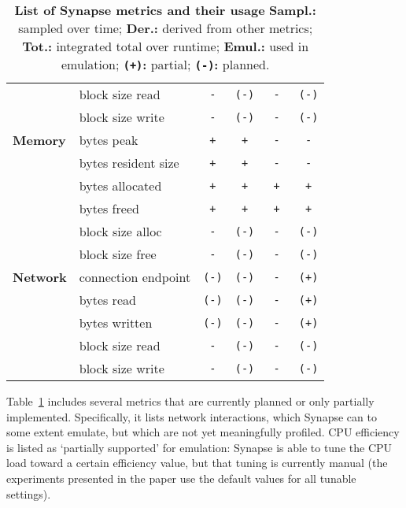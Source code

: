 \documentclass[10pt, conference, compsocconf]{IEEEtran}
\newcommand{\B}[1]{\textbf{#1}\xspace}
\newcommand{\T}[1]{\texttt{#1}\xspace}
\newcommand{\synapse}{Synapse\xspace}
\begin{document}
\begin{table}[t]
\begin{center}
\begin{tabular}{llcccc}
                 & block size read         &  \T{ - } &   \T{(-)} &  \T{ - } &  \T{(-)} \\
                 & block size write        &  \T{ - } &   \T{(-)} &  \T{ - } &  \T{(-)} \\\midrule
    \B{Memory}   & bytes peak              &  \T{ + } &   \T{ + } &  \T{ - } &  \T{ - } \\
                 & bytes resident size     &  \T{ + } &   \T{ + } &  \T{ - } &  \T{ - } \\
                 & bytes allocated         &  \T{ + } &   \T{ + } &  \T{ + } &  \T{ + } \\
                 & bytes freed             &  \T{ + } &   \T{ + } &  \T{ + } &  \T{ + } \\
                 & block size alloc        &  \T{ - } &   \T{(-)} &  \T{ - } &  \T{(-)} \\
                 & block size free         &  \T{ - } &   \T{(-)} &  \T{ - } &  \T{(-)} \\\midrule
    \B{Network}  & connection endpoint     &  \T{(-)} &   \T{(-)} &  \T{ - } &  \T{(+)} \\
                 & bytes read              &  \T{(-)} &   \T{(-)} &  \T{ - } &  \T{(+)} \\
                 & bytes written           &  \T{(-)} &   \T{(-)} &  \T{ - } &  \T{(+)} \\
                 & block size read         &  \T{ - } &   \T{(-)} &  \T{ - } &  \T{(-)} \\
                 & block size write        &  \T{ - } &   \T{(-)} &  \T{ - } &  \T{(-)} \\\midrule
   \end{tabular}
   \caption{
       \B{List of \synapse metrics and their usage}\newline
       \B{Sampl.:} sampled over time;
       \B{Der.:} derived from other metrics;\newline
       \B{Tot.:} integrated total over runtime;
       \B{Emul.:} used in emulation;\newline
       \B{\T{(+)}:} partial;
       \B{\T{(-)}:} planned.
       \label{tab:metrics}
   }
  \end{center}
 \end{table}

 Table~\ref{tab:metrics} includes several metrics that are currently
 planned or only partially implemented.  Specifically, it lists
 network interactions, which \synapse can to some extent emulate, but
 which are not yet meaningfully profiled.  
CPU efficiency is listed as `partially supported' for emulation:
 \synapse is able to tune the CPU load toward a certain efficiency
 value, but that tuning is currently manual (the experiments presented
 in the paper use the default values for all tunable settings).
\end{document}
